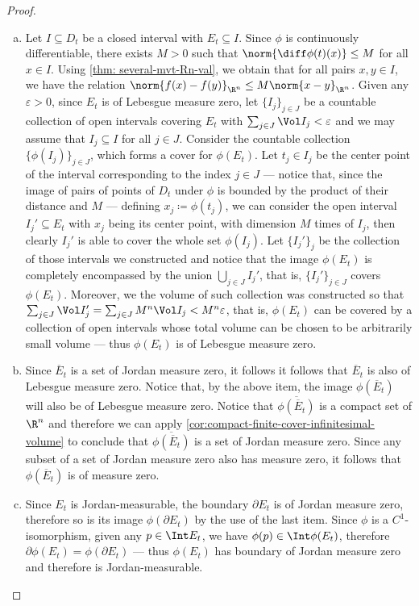 \begin{proof}
\begin{enumerate}[(a)]\setlength\itemsep{0em}
\item Let \(I \subseteq D_t\) be a closed interval with \(E_t \subseteq
I\). Since \(\phi\) is continuously differentiable, there exists \(M > 0\) such
that \(\norm{\diff \phi(t)(x)} \leq M\) for all \(x \in I\). Using \cref{thm:
several-mvt-Rn-val}, we obtain that for all pairs \(x, y \in I\), we have the
relation \(\norm{f(x) - f(y)}_{\R^n} \leq M \norm{x - y}_{\R^n}\). Given any
\(\varepsilon > 0\), since \(E_t\) is of Lebesgue measure zero, let
\(\{I_{j}\}_{j \in J}\) be a countable collection of open intervals covering
\(E_t\) with \(\sum_{j \in J} \Vol I_j < \varepsilon\) and we may assume that
\(I_j \subseteq I\) for all \(j \in J\). Consider the countable collection
\(\{\phi(I_{j})\}_{j \in J}\), which forms a cover for \(\phi(E_t)\). Let \(t_j
\in I_j\) be the center point of the interval corresponding to the index \(j \in
J\) --- notice that, since the image of pairs of points of \(D_t\) under
\(\phi\) is bounded by the product of their distance and \(M\) --- defining
\(x_j \coloneq \phi(t_j)\), we can consider the open interval \(I_j' \subseteq
E_t\) with \(x_j\) being its center point, with dimension \(M\) times of
\(I_j\), then clearly \(I_j'\) is able to cover the whole set \(\phi(I_j)\). Let
\(\{I_{j}'\}_j\) be the collection of those intervals we constructed and notice
that the image \(\phi(E_t)\) is completely encompassed by the union \(\bigcup_{j
\in J} I_j'\), that is, \(\{I_{j}'\}_{j \in J}\) covers \(\phi(E_t)\). Moreover,
we the volume of such collection was constructed so that \(\sum_{j \in J} \Vol
I_j' = \sum_{j \in J} M^n \Vol I_j < M^n \varepsilon\), that is, \(\phi(E_t)\)
can be covered by a collection of open intervals whose total volume can be
chosen to be arbitrarily small volume --- thus \(\phi(E_t)\) is of Lebesgue
measure zero.

\item Since \(\overline E_t\) is a set of Jordan measure zero, it follows it
  follows that \(\overline E_t\) is also of Lebesgue measure zero. Notice that,
  by the above item, the image \(\phi(\overline E_t)\) will also be of Lebesgue
  measure zero. Notice that \(\overline{\phi(\overline E_t)}\) is a compact set
  of \(\R^n\) and therefore we can apply
  \cref{cor:compact-finite-cover-infinitesimal-volume} to conclude that
  \(\overline{\phi(\overline E_t)}\) is a set of Jordan measure zero. Since any
  subset of a set of Jordan measure zero also has measure zero, it follows that
  \(\phi(\overline E_t)\) is of measure zero.

\item Since \(E_t\) is Jordan-measurable, the boundary \(\partial E_t\) is of
  Jordan measure zero, therefore so is its image \(\phi(\partial E_t)\) by the
  use of the last item. Since \(\phi\) is a \(C^1\)-isomorphism, given any \(p \in
  \Int E_t\), we have \(\phi(p) \in \Int \phi(E_t)\), therefore \(\partial
  \phi(E_t) = \phi(\partial E_t)\) --- thus \(\phi(E_t)\) has boundary of Jordan
  measure zero and therefore is Jordan-measurable.
\end{enumerate}
\end{proof}


